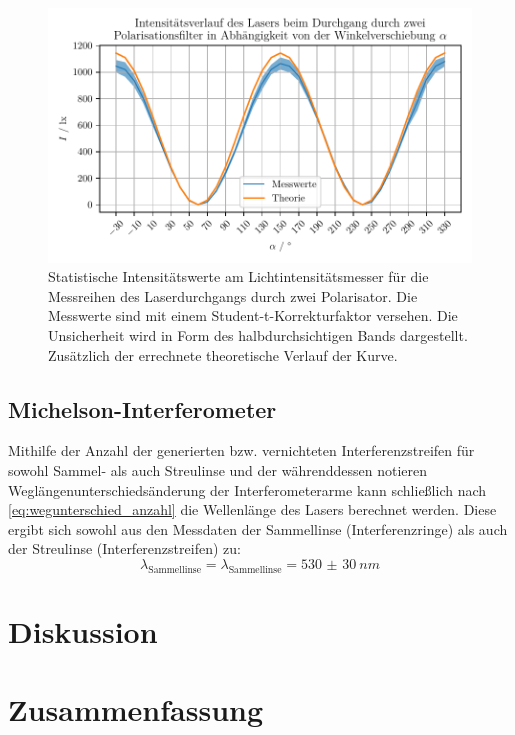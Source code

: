 \documentclass[ngerman]{scrartcl}
\begin{document}
\begin{figure}[H]
    \centering
    \begin{samepage}
        \includegraphics[width=\linewidth]{../python/plots/polarisation.pdf}
        \caption[Messkurve Polarisation]{Statistische Intensitätswerte am Lichtintensitätsmesser für die Messreihen des Laserdurchgangs durch zwei Polarisator. Die Messwerte sind mit einem Student-t-Korrekturfaktor versehen. Die Unsicherheit wird in Form des halbdurchsichtigen Bands dargestellt. Zusätzlich der errechnete theoretische Verlauf der Kurve.}
        \label{fig:auswertung_polarisation}
    \end{samepage}
\end{figure}


\subsection{Michelson-Interferometer}
\label{subsec:auswertung_michelson}

Mithilfe der Anzahl der generierten bzw. vernichteten Interferenzstreifen für sowohl Sammel- als auch Streulinse und der währenddessen notieren Weglängenunterschiedsänderung der Interferometerarme kann schließlich nach \autoref{eq:wegunterschied_anzahl} die Wellenlänge des Lasers berechnet werden. Diese ergibt sich sowohl aus den Messdaten der Sammellinse (Interferenzringe) als auch der Streulinse (Interferenzstreifen) zu:
\[\lambda_{\text{Sammellinse}} = \lambda_{\text{Sammellinse}} = \SI{530(30)}{nm}\]


\section{Diskussion}
\label{sec:diskussion}


\section{Zusammenfassung}
\label{sec:zusammenfassung}


\clearpage
\printbibliography

\listoffigures

\listoftables
\end{document}
